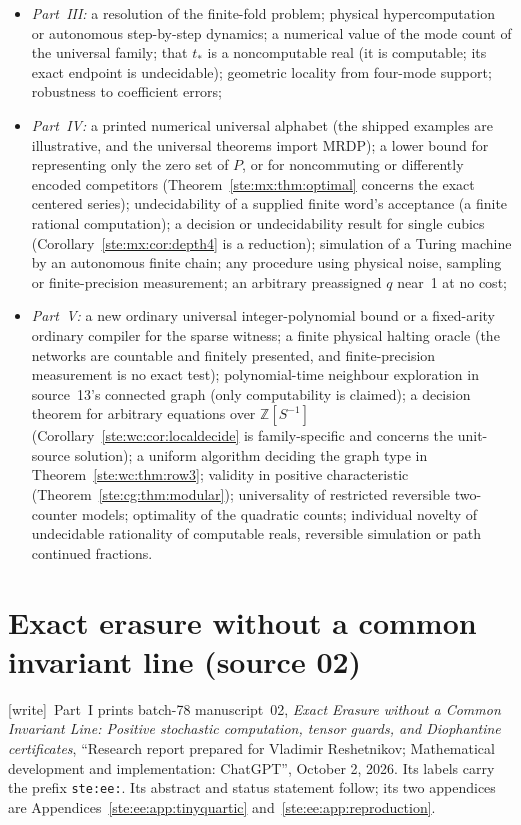 \documentclass[11pt,letterpaper]{article}
\theoremstyle{definition}
\theoremstyle{remark}
\newcommand{\Z}{\mathbb Z}
\newcommand{\wtag}{\textup{[write]}}
\begin{document}
\begin{itemize}
\item \emph{Part~III:} a resolution of the finite-fold problem; physical hypercomputation or autonomous step-by-step dynamics; a numerical value of the mode count of the universal family; that $t_*$ is a noncomputable real (it is computable; its exact endpoint is undecidable); geometric locality from four-mode support; robustness to coefficient errors;
\item \emph{Part~IV:} a printed numerical universal alphabet (the shipped examples are illustrative, and the universal theorems import MRDP); a lower bound for representing only the zero set of $P$, or for noncommuting or differently encoded competitors (Theorem~\ref{ste:mx:thm:optimal} concerns the exact centered series); undecidability of a supplied finite word's acceptance (a finite rational computation); a decision or undecidability result for single cubics (Corollary~\ref{ste:mx:cor:depth4} is a reduction); simulation of a Turing machine by an autonomous finite chain; any procedure using physical noise, sampling or finite-precision measurement; an arbitrary preassigned $q$ near~1 at no cost;
\item \emph{Part~V:} a new ordinary universal integer-polynomial bound or a fixed-arity ordinary compiler for the sparse witness; a finite physical halting oracle (the networks are countable and finitely presented, and finite-precision measurement is no exact test); polynomial-time neighbour exploration in source~13's connected graph (only computability is claimed); a decision theorem for arbitrary equations over $\Z[S^{-1}]$ (Corollary~\ref{ste:wc:cor:localdecide} is family-specific and concerns the unit-source solution); a uniform algorithm deciding the graph type in Theorem~\ref{ste:wc:thm:row3}; validity in positive characteristic (Theorem~\ref{ste:cg:thm:modular}); universality of restricted reversible two-counter models; optimality of the quadratic counts; individual novelty of undecidable rationality of computable reals, reversible simulation or path continued fractions.
\end{itemize}

\part{Exact erasure without a common invariant line (source 02)}\label{ste:part:ee}

\noindent\wtag\ Part~I prints batch-78 manuscript~02, \emph{Exact Erasure without a Common Invariant Line: Positive stochastic computation, tensor guards, and Diophantine certificates}, ``Research report prepared for Vladimir Reshetnikov; Mathematical development and implementation: ChatGPT'', October 2, 2026. Its labels carry the prefix \texttt{ste:ee:}. Its abstract and status statement follow; its two appendices are Appendices~\ref{ste:ee:app:tinyquartic} and~\ref{ste:ee:app:reproduction}.
\end{document}
